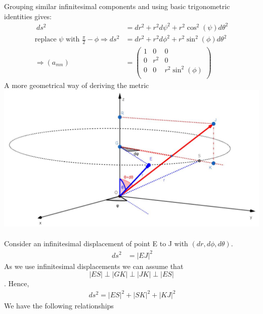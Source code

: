 Grouping similar infinitesimal components and using basic trigonometric identities gives:
\begin{align}
\ ds^2 &= dr^2 +  r^2d\psi^2 + r^2\cos^2(\psi)d\theta^2\\
\text{replace  }\psi\text{ with } \frac{\pi}{2}-\phi \Rightarrow ds^2 &= dr^2 +  r^2d\phi^2 + r^2\sin^2(\phi)d\theta^2\\
\Rightarrow (a_{mn}) &= \begin{pmatrix}
 1& 0 & 0\\
0 & r^2 & 0 \\
0 & 0 & r^2\sin^2(\phi) \\
\end{pmatrix}
\end{align}
\newpage
A more geometrical way of deriving the metric\\
\includegraphics[scale=.6]{sphericalmetric.jpg}\\\\
Consider an infinitesimal displacement of point E to J with $(dr, d\phi , d\theta)$.
\begin{align}
\ ds^2 &= |EJ|^2
\end{align}
As we use infinitesimal displacements we can assume that $$|ES|\perp|GK|\perp|JK|\perp|ES|$$. Hence,
\begin{align}
\ ds^2 = |ES|^2+|SK|^2+|KJ|^2
\end{align}
We have the following relationships
